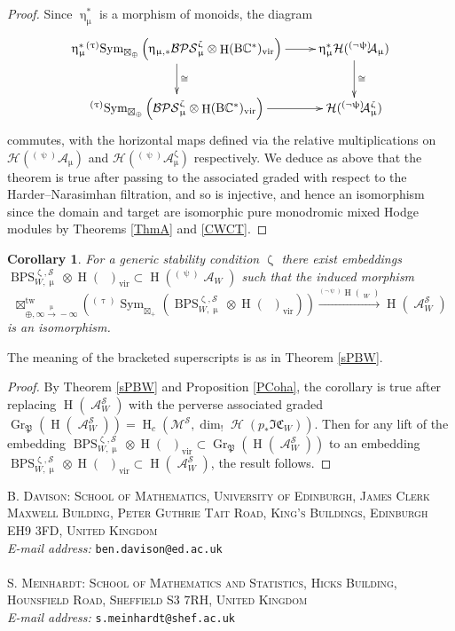 \documentclass[a4paper,10pt]{amsart}
\renewcommand{\zeta}{\upzeta}
\renewcommand{\psi}{\uppsi}
\renewcommand{\tau}{\uptau}
\renewcommand{\mu}{\upmu}
\renewcommand{\eta}{\upeta}
\newtheorem{corollary}[theorem]{Corollary}
\DeclareMathOperator{\BC}{B\mathbb{C}^*}
\DeclareMathOperator{\Pf}{\mathfrak{P}}
\newcommand{\SP}{\mathcal{S}}
\newcommand{\Msp}{\mathcal{M}}
\newcommand{\ICSt}{\mathfrak{IC}}
\newcommand{\DTS}{\mathcal{BPS}}
\DeclareMathOperator{\tw}{tw}
\DeclareMathOperator{\Gr}{Gr}
\DeclareMathOperator{\ms}{\tilde{\ast}}
\DeclareMathOperator{\DT}{BPS}
\DeclareMathOperator{\Sym}{Sym}
\DeclareMathOperator{\vir}{vir}
\DeclareMathOperator{\Ho}{\mathcal{H}}
\DeclareMathOperator{\HO}{H}
\DeclareMathOperator{\Coha}{\mathcal{A}}
\begin{document}
\begin{proof}
Since $\eta_{\mu}^*$ is a morphism of monoids, the diagram 
\[
\xymatrix{
\eta_{\mu}^* {}^{(\tau)}\!\Sym_{\boxtimes_{\oplus}}\left(\eta_{\mu,*}\DTS_{\mu}^{\zeta}\otimes\HO(\BC )_{\vir}\right)\ar[d]^{\cong}\ar[r]& \eta_{\mu}^*\mathcal{H}({}^{(\neg\psi)}\!\!\mathcal{A}_{\mu})\ar[d]^{\cong}\\
{}^{(\tau)}\!\Sym_{\boxtimes_{\oplus}}\left(\DTS_{\mu}^{\zeta}\otimes\HO(\BC )_{\vir}\right)\ar[r]& \mathcal{H}({}^{(\neg\psi)}\!\!\mathcal{A}_{\mu}^{\zeta})
}
\]
commutes, with the horizontal maps defined via the relative multiplications on $\mathcal{H}({}^{(\psi)}\!\!\mathcal{A}_{\mu})$ and $\mathcal{H}({}^{(\psi)}\!\!\mathcal{A}_{\mu}^{\zeta})$ respectively.  We deduce as above that the theorem is true after passing to the associated graded with respect to the Harder--Narasimhan filtration, and so is injective, and hence an isomorphism since the domain and target are isomorphic pure monodromic mixed Hodge modules by Theorems \ref{ThmA} and \ref{CWCT}.
\end{proof}
\begin{corollary}
For a generic stability condition $\zeta$ there exist embeddings $\DT^{\zeta,\SP}_{W,\mu}\otimes\HO(\BC )_{\vir}\subset \HO({}^{(\psi)}\!\!\Coha_{W})$ such that the induced morphism
\[
\boxtimes_{\oplus,\infty \xrightarrow{\mu}-\infty}^{\tw}\left({}^{(\tau)}\!\Sym_{\boxtimes_+}\left(\DT^{\zeta,\SP}_{W,\mu}\otimes\HO(\BC )_{\vir}\right)\right)\xrightarrow{{}^{(\neg\psi)}\!\!\HO(\ms_W)}\HO(\Coha^{\SP}_W)
\]
is an isomorphism.
\end{corollary}
The meaning of the bracketed superscripts is as in Theorem \ref{sPBW}.
\begin{proof}
By Theorem \ref{sPBW} and Proposition \ref{PCoha}, the corollary is true after replacing $\HO(\Coha^{\SP}_W)$ with the perverse associated graded $\Gr_{\Pf}(\HO(\Coha^{\SP}_{W}))=\HO_c(\Msp^{\SP},\dim_!\Ho(p_*\ICSt_W))$.  Then for any lift of the embedding $\DT^{\zeta,\SP}_{W,\mu}\otimes\HO(\BC )_{\vir}\subset \Gr_{\Pf}(\HO(\Coha^{\SP}_{W}))$ to an embedding $\DT^{\zeta,\SP}_{W,\mu}\otimes\HO(\BC )_{\vir}\subset \HO(\Coha^{\SP}_{W})$, the result follows.
\end{proof}





\vfill

\textsc{\small B. Davison: School of Mathematics, University of Edinburgh, James Clerk Maxwell Building, Peter Guthrie Tait Road, King's Buildings, Edinburgh EH9 3FD, United Kingdom}\\
\textit{\small E-mail address:} \texttt{\small ben.davison@ed.ac.uk}\\
\\

\textsc{\small S. Meinhardt: School of Mathematics and Statistics, Hicks Building, Hounsfield Road, Sheffield S3 7RH, United Kingdom}\\
\textit{\small E-mail address:} \texttt{\small s.meinhardt@shef.ac.uk}\\
\end{document}
